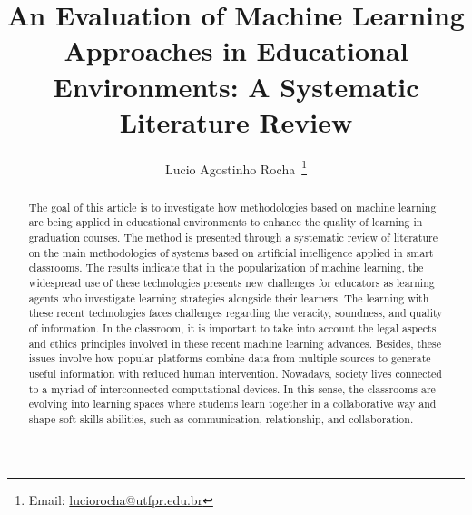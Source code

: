 \documentclass[english]{textolivre}
\title{An Evaluation of Machine Learning Approaches in Educational Environments: A Systematic Literature Review}
\author[1]{Lucio Agostinho Rocha~\orcid{0000-0001-8804-8698}\thanks{Email: \href{mailto:luciorocha@utfpr.edu.br}{luciorocha@utfpr.edu.br}}}
\affil[1]{Universidade Tecnológica Federal do Paraná, Engenharia de Computação, Apucarana, PR, Brasil.}
\begin{document}
\maketitle
\begin{polyabstract}
\begin{abstract}
The goal of this article is to investigate how methodologies
based on machine learning are being applied in educational environments
to enhance the quality of learning in graduation courses. The method is
presented through a systematic review of literature on the main
methodologies of systems based on artificial intelligence applied in
smart classrooms. The results indicate that in the popularization of
machine learning, the widespread use of these technologies presents new
challenges for educators as learning agents who investigate learning
strategies alongside their learners. The learning with these recent
technologies faces challenges regarding the veracity, soundness, and
quality of information. In the classroom, it is important to take into
account the legal aspects and ethics principles involved in these recent
machine learning advances. Besides, these issues involve how popular
platforms combine data from multiple sources to generate useful
information with reduced human intervention. Nowadays, society lives
connected to a myriad of interconnected computational devices. In this
sense, the classrooms are evolving into learning spaces where students
learn together in a collaborative way and shape soft-skills abilities,
such as communication, relationship, and collaboration.

\end{abstract}


\end{polyabstract}
\end{document}
